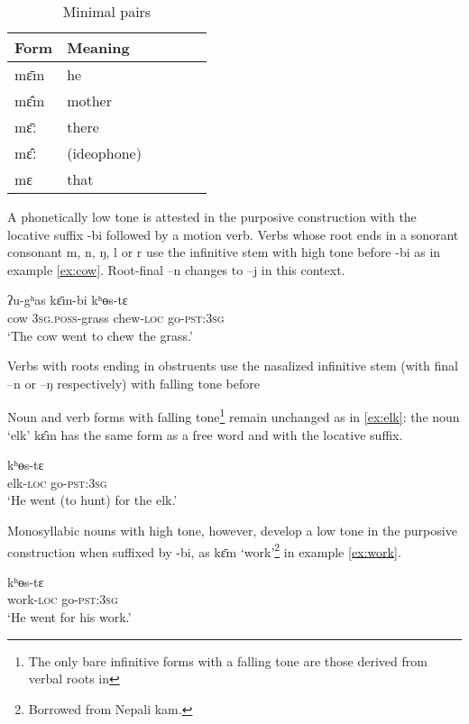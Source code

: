 \documentclass[oldfontcommands,oneside,a4paper,11pt]{article}
\newcommand{\ipa}[1]{{\phon \mbox{#1}}} %
\begin{document}
\begin{table}[H]
\caption{Minimal pairs} \label{tab:minimal.pairs}\centering
\begin{tabular}{llllll}
\toprule
Form & Meaning\\
\midrule
\ipa{mɛ̄m} & he \\
\ipa{mɛ̂m} & mother\\
\ipa{mɛ̄ː} & there\\
\ipa{mɛ̂ː} & (ideophone) \\
\ipa{mɛ} & that\\
\bottomrule
\end{tabular}
\end{table}

A phonetically low tone is attested in the purposive construction with the locative suffix \ipa{-bi} followed by a motion verb. Verbs  whose root ends in a sonorant consonant \ipa{m}, \ipa{n}, \ipa{ŋ}, \ipa{l} or \ipa{r} use the infinitive stem with high tone before  \ipa{-bi} as in example \ref{ex:cow}. Root-final   \ipa{--n} changes to \ipa{--j} in this context. 

\begin{exe}
\ex \label{ex:cow}
\gll \ipa{bʌ̂j} \ipa{ʔu-gʰas} \ipa{kɛ̄m-bi} \ipa{kʰɵs-tɛ}  \\
cow \textsc{3sg.poss}-grass chew-\textsc{loc} go-\textsc{pst:3sg} \\
\glt `The cow went to chew the grass.'
\end{exe}

Verbs with roots ending in obstruents use the nasalized infinitive stem (with final \ipa{--n} or \ipa{--ŋ} respectively) with falling tone before

Noun  and verb forms with falling tone\footnote{The only bare infinitive forms with a  falling tone are those derived from verbal roots in} remain unchanged as in \ref{ex:elk}: the noun `elk' \ipa{kɛ̂m} has the same form as a free word and with the locative suffix.

\begin{exe}
\ex \label{ex:elk}
\gll   \ipa{kɛ̂m-bi} \ipa{kʰɵs-tɛ}  \\
elk-\textsc{loc} go-\textsc{pst:3sg} \\
\glt `He went (to hunt) for the elk.'
\end{exe}


Monosyllabic nouns with high tone, however, develop a low tone in the purposive construction when suffixed by \ipa{-bi}, as \ipa{kɛ̄m}  `work'\footnote{Borrowed from Nepali \ipa{kam}.} in example \ref{ex:work}.
\begin{exe}
\ex \label{ex:work}
\gll   \ipa{kɛ̀m-bi} \ipa{kʰɵs-tɛ}  \\
work-\textsc{loc} go-\textsc{pst:3sg} \\
\glt `He went for his work.'
\end{exe}
\end{document}
